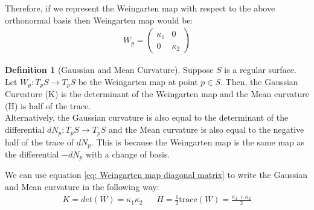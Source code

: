 \documentclass{article}
\theoremstyle{plain}
\theoremstyle{definition}
\newtheorem{definition}{Definition}
\theoremstyle{remark}
\begin{document}
Therefore, if we represent the Weingarten map with respect to the above orthonormal basis then Weingarten map would be:
\begin{align} \label{eq: Weingarten map diagonal matrix}
    W_p = \begin{pmatrix}
        \kappa_1 & 0        \\
        0        & \kappa_2
    \end{pmatrix}
\end{align}
\begin{definition}[Gaussian and Mean Curvature]
    Suppose \(S\) is a regular surface. Let \( W_p: T_pS \rightarrow T_pS \) be the Weingarten map at point \( p \in S\). Then, the Gaussian Curvature (K) is the determinant of the Weingarten map and the Mean curvature (H) is half of the trace. \\
    Alternatively, the Gaussian curvature is also equal to the determinant of the differential \( dN_p: T_pS \rightarrow T_pS \) and the  Mean curvature is also equal to the negative half of the trace of \( dN_p\). This is because the Weingarten map is the same map as the differential \( -dN_p \) with a change of basis.
\end{definition}

We can use equation \ref{eq: Weingarten map diagonal matrix} to write the Gaussian and Mean curvature in the following way:
\begin{align*}
    K = det(W) = \kappa_1\kappa_2 && H = \frac{1}{2} \text{trace}(W) = \frac{\kappa_1 + \kappa_2 }{2}
\end{align*}
\end{document}
